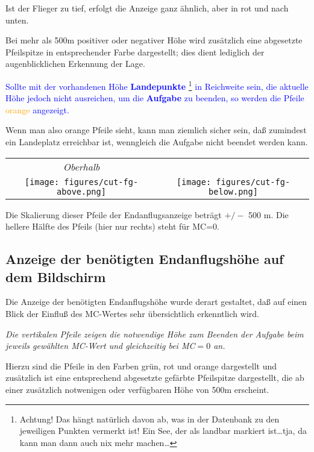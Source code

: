 Ist der Flieger zu tief, erfolgt die Anzeige ganz ähnlich, aber in rot und nach unten.

Bei mehr als 500m positiver oder negativer Höhe wird zusätzlich eine abgesetzte Pfeilspitze in entsprechender
Farbe dargestellt; dies dient lediglich der augenblicklichen Erkennung der Lage.

\textcolor{blue}{Sollte mit der vorhandenen Höhe \textbf{Landepunkte} \footnote{Achtung!  Das hängt natürlich  davon ab, was in der Datenbank zu den jeweiligen Punkten vermerkt ist!  Ein See, der als landbar markiert ist\dots  tja, da kann man dann auch nix mehr  machen\dots} in Reichweite sein, \achtung die aktuelle Höhe jedoch nicht ausreichen, um die \textbf{ Aufgabe} zu beenden, so werden die Pfeile \textcolor{orange}{orange} angezeigt.}

Wenn man also orange Pfeile sieht, kann man ziemlich sicher sein, daß zumindest ein Landeplatz erreichbar ist, wenngleich die Aufgabe nicht beendet werden kann. 

\begin{center}
\begin{tabular}{c c}
{\it Oberhalb}\phantom{ABC} & \phantom{ABC}{\it Unterhalb} \quad  \\
\texttt{[image: figures/cut-fg-above.png]} &
\texttt{[image: figures/cut-fg-below.png]}
\end{tabular}
\end{center}
Die Skalierung dieser Pfeile der Endanflugsanzeige beträgt $+/-$ 500 m.  
Die hellere Hälfte des Pfeils (hier nur rechts) steht für MC=0.


\subsection*{Anzeige der benötigten Endanflugshöhe auf dem Bildschirm}\label{sec:finalheight-indicator}

Die Anzeige der benötigten Endanflugshöhe wurde derart gestaltet, daß auf einen Blick der
Einfluß des MC-Wertes sehr übersichtlich erkenntlich wird.

\emph{Die vertikalen Pfeile zeigen die notwendige Höhe zum Beenden der Aufgabe
beim jeweils gewählten MC-Wert und gleichzeitig  bei MC$=0$ an.}

Hierzu sind die Pfeile in den Farben grün, rot und orange dargestellt und zusätzlich ist eine entsprechend
abgesetzte gefärbte Pfeilspitze dargestellt, die ab einer zusätzlich notwenigen oder verfügbaren Höhe
von 500m erscheint.

